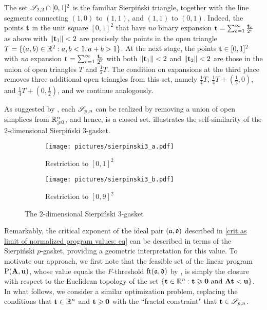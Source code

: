 \documentclass{article}
\begin{document}
\begin{example}
   \label{sierpinski triangle: E}
   The set $\mathscr{S}_{2,2} \cap [0,1]^2$ is the familiar Sierpi\'nski triangle, together with the line segments connecting $(1,0)$ to $(1,1)$, and $(1,1)$ to $(0,1)$.
   Indeed, the points $\mathbf{t}$ in the unit square $[0,1]^2$ that have \emph{no} binary expansion $\mathbf{t} = \sum_{e=1}^{\infty}\frac{\mathbf{t}_e}{2^e}$ as above with $\| \mathbf{t}_1 \| < 2$ are precisely the points in the open triangle  $T = \{ (a,b) \in \mathbb{R}^2 : a,b < 1, a+b > 1 \}$.
   At the next stage, the points $\mathbf{t} \in [0,1]^2$ with \emph{no} expansion $\mathbf{t} = \sum_{e=1}^{\infty}\frac{\mathbf{t}_e}{2^e}$ with both  $\| \mathbf{t}_1 \| < 2$ and $\| \mathbf{t}_2 \| < 2$ are those in the union of open triangles $T$ and $\frac{1}{2} T$.
   The condition on expansions at the third place removes three additional open triangles from this set, namely $\frac14 T$, $\frac14 T + (\frac12,0)$, and $\frac14 T + (0,\frac12)$, and we continue analogously.
\end{example}

As suggested by , each $\mathscr{S}_{p,n}$  can be realized by removing a union of open simplices from $\mathbb{R}_{\geqslant 0}^n$, and hence, is a closed set.
 illustrates the self-similarity of the $2$-dimensional Sierpi\'nski $3$-gasket.

\begin{figure}
\begin{subfigure}{.49\textwidth}
  \centering
  \texttt{[image: pictures/sierpinski3\_a.pdf]}
  \caption{Restriction to $[0,1]^2$}
\end{subfigure}
\begin{subfigure}{.49\textwidth}
  \centering
  \texttt{[image: pictures/sierpinski3\_b.pdf]}
  \caption{Restriction to $[0,9]^2$}
\end{subfigure}
\caption{The $2$-dimensional Sierpi\'nski 3-gasket}
\label{fig: sierpinski 3-gasket}
\end{figure}

Remarkably, the critical exponent of the ideal pair $(\mathfrak{a}, \mathfrak{d})$ described in \eqref{crit as limit of normalized program values: eq} can be described in terms of the Sierpi\'nski $p$-gasket, providing a geometric interpretation for this value.
To motivate our approach, we first note that the feasible set of the linear program $\mathrm{P}(\mathbf{A}, \mathbf{u})$, whose value equals the $F$-threshold $\operatorname{ft}(\mathfrak{a}, \mathfrak{d})$ by , is simply the closure with respect to the Euclidean topology of the set $\{ \mathbf{t} \in \mathbb{R}^n : \mathbf{t} \geqslant \mathbf{0} \text{ and } \mathbf{A}\mathbf{t} < \mathbf{u} \}$.
In what follows, we consider a similar optimization problem,  replacing the conditions that $\mathbf{t} \in \mathbb{R}^n$ and $\mathbf{t} \geqslant \mathbf{0}$ with the ``fractal constraint" that $\mathbf{t} \in \mathscr{S}_{p,n}$.
\end{document}
